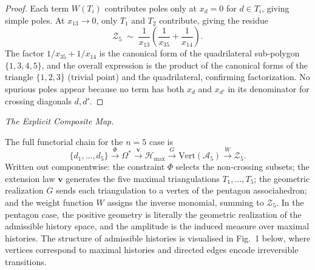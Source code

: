 \documentclass[11pt]{article}
\theoremstyle{plain}
\theoremstyle{definition}
\theoremstyle{remark}
\newcommand{\Phif}{\Phi}
\newcommand{\OmKS}{\Omega}
\newcommand{\Hmax}{\mathcal{H}_{\max}}
\begin{document}
\begin{proof}
Each term $W(T_i)$ contributes poles only at $x_d = 0$ for $d \in T_i$, giving simple poles. At $x_{13} \to 0$, only $T_1$ and $T_2$ contribute, giving the residue
\[
  \mathcal{Z}_5 \;\sim\; \frac{1}{x_{13}} \left(\frac{1}{x_{35}} + \frac{1}{x_{14}}\right).
\]
The factor $1/x_{35} + 1/x_{14}$ is the canonical form of the quadrilateral sub-polygon $\{1,3,4,5\}$, and the overall expression is the product of the canonical forms of the triangle $\{1,2,3\}$ (trivial point) and the quadrilateral, confirming factorization. No spurious poles appear because no term has both $x_d$ and $x_{d'}$ in its denominator for crossing diagonals $d, d'$.
\end{proof}

\medskip\noindent\textit{The Explicit Composite Map.}

The full functorial chain for the $n=5$ case is
\begin{equation}
\label{eq:composite-map}
  \{d_1,\ldots,d_5\} \xrightarrow{\Phif} \OmKS^* \xrightarrow{\mathbf{v}} \Hmax \xrightarrow{G} \mathrm{Vert}(\mathcal{A}_5) \xrightarrow{W} \mathcal{Z}_5.
\end{equation}
Written out componentwise: the constraint $\Phif$ selects the non-crossing subsets; the extension law $\mathbf{v}$ generates the five maximal triangulations $T_1, \ldots, T_5$; the geometric realization $G$ sends each triangulation to a vertex of the pentagon associahedron; and the weight function $W$ assigns the inverse monomial, summing to $\mathcal{Z}_5$. In the pentagon case, the positive geometry is literally the geometric realization of the admissible history space, and the amplitude is the induced measure over maximal histories. The structure of admissible histories is visualised in Fig.~1 below, where vertices correspond to maximal histories and directed edges encode irreversible transitions.
\end{document}

